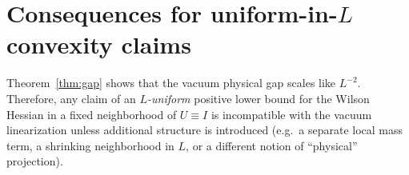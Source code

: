 \documentclass[11pt]{article}
\begin{document}
\section{Consequences for uniform-in-$L$ convexity claims}

Theorem~\ref{thm:gap} shows that the vacuum physical gap scales like $L^{-2}$.
Therefore, any claim of an \emph{$L$-uniform} positive lower bound for the Wilson Hessian in a fixed neighborhood of $U\equiv I$ is incompatible with the vacuum linearization unless additional structure is introduced (e.g.\ a separate local mass term, a shrinking neighborhood in $L$, or a different notion of ``physical'' projection).
\end{document}
